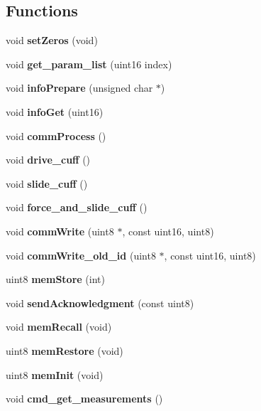 \subsection*{Functions}
\begin{DoxyCompactItemize}
\item 
\mbox{\label{command__processing_8h_abb781ac00e0752ce772a75f7b5d1a5b7}} 
void {\bfseries set\+Zeros} (void)
\item 
\mbox{\label{command__processing_8h_a5ef086c932682ca5f7549b74ead732aa}} 
void {\bfseries get\+\_\+param\+\_\+list} (uint16 index)
\item 
\mbox{\label{command__processing_8h_a6fda7bc0be24d261f9cb09e77616b1be}} 
void {\bfseries info\+Prepare} (unsigned char $\ast$)
\item 
\mbox{\label{command__processing_8h_a813734e69ea461791f84bddee422013f}} 
void {\bfseries info\+Get} (uint16)
\item 
\mbox{\label{command__processing_8h_a2e5d1711e19837adc3e8f479af3ae509}} 
void {\bfseries comm\+Process} ()
\item 
\mbox{\label{command__processing_8h_a8d9f34c84c2a23fa548a5266aa8227a6}} 
void {\bfseries drive\+\_\+cuff} ()
\item 
\mbox{\label{command__processing_8h_a6a2c32899a5eea25c6f4a9b46f78a627}} 
void {\bfseries slide\+\_\+cuff} ()
\item 
\mbox{\label{command__processing_8h_a6d07d0d461f026726b88e1dda1a89ff3}} 
void {\bfseries force\+\_\+and\+\_\+slide\+\_\+cuff} ()
\item 
\mbox{\label{command__processing_8h_af59b7a35df04af1df698749a771890eb}} 
void {\bfseries comm\+Write} (uint8 $\ast$, const uint16, uint8)
\item 
\mbox{\label{command__processing_8h_af454a3663070706183ebf8f1ba784343}} 
void {\bfseries comm\+Write\+\_\+old\+\_\+id} (uint8 $\ast$, const uint16, uint8)
\item 
uint8 \textbf{ mem\+Store} (int)
\item 
\mbox{\label{command__processing_8h_afe5c87f9df9bb965976b5d40c4159f1f}} 
void {\bfseries send\+Acknowledgment} (const uint8)
\item 
void \textbf{ mem\+Recall} (void)
\item 
uint8 \textbf{ mem\+Restore} (void)
\item 
uint8 \textbf{ mem\+Init} (void)
\item 
void \textbf{ cmd\+\_\+get\+\_\+measurements} ()
\item 
\mbox{\label{command__processing_8h_a20db4694e8caa572ec479f73ce8b3b02}} 

\end{DoxyCompactItemize}
